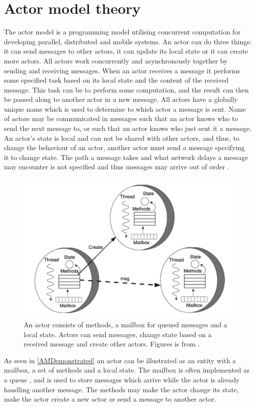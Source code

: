 \section{Actor model theory}
The actor model is a programming model utilising concurrent computation for developing parallel, distributed and mobile systems. An actor can do three things: it can send messages to other actors, it can update its local state or it can create more actors. All actors work concurrently and asynchronously together by sending and receiving messages. When an actor receives a message it performs some specified task based on its local state and the content of the received message. This task can be to perform some computation, and the result can then be passed along to another actor in a new message. All actors have a globally unique name which is used to determine to which actor a message is sent. Name of actors may be communicated in messages such that an actor knows who to send the next message to, or such that an actor knows who just sent it a message. An actor's state is local and can not be shared with other actors, and thus, to change the behaviour of an actor, another actor must send a message specifying it to change state. The path a message takes and what network delays a message may encounter is not specified and thus messages may arrive out of order \cite{ActorModelPaper}.\\
\begin{figure}[H]
	\centering
	\includegraphics[width=0.85\linewidth]{Materials/ActorModel/AMDemonstrated}
	\caption{An actor consists of methods, a mailbox for queued messages and a local state. Actors can send messages, change state based on a received message and create other actors. Figures is from \cite{ActorModelPaper}.}
	\label{AMDemonstrated}
\end{figure}
As seen in \autoref{AMDemonstrated} an actor can be illustrated as an entity with a mailbox, a set of methods and a local state. The mailbox is often implemented as a queue \cite{ActorModelPaper}, and is used to store messages which arrive while the actor is already handling another message. The methods may make the actor change its state, make the actor create a new actor or send a message to another actor.\\
